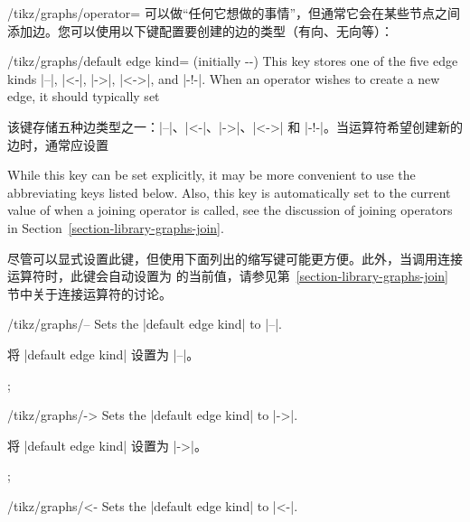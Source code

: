 \begin{key}{/tikz/graphs/operator=}
     可以做“任何它想做的事情”，但通常它会在某些节点之间添加边。您可以使用以下键配置要创建的边的类型（有向、无向等）：

    \begin{key}{/tikz/graphs/default edge kind= (initially -\/-)}
        This key stores one of the five edge kinds |--|, |<-|, |->|, |<->|, and
        |-!-|. When an operator wishes to create a new edge, it should
        typically set

        该键存储五种边类型之一：|--|、|<-|、|->|、|<->| 和 |-!-|。当运算符希望创建新的边时，通常应设置
\begin{codeexample}
\end{codeexample}
        While this key can be set explicitly, it may be more convenient to use
        the abbreviating keys listed below. Also, this key is automatically set
        to the current value of  when a joining
        operator is called, see the discussion of joining operators in
        Section~\ref{section-library-graphs-join}.

        尽管可以显式设置此键，但使用下面列出的缩写键可能更方便。此外，当调用连接运算符时，此键会自动设置为  的当前值，请参见第~\ref{section-library-graphs-join} 节中关于连接运算符的讨论。

      \end{key}
    \begin{key}{/tikz/graphs/--}
        Sets the |default edge kind| to |--|.
        
        将 |default edge kind| 设置为 |--|。


\begin{codeexample}[preamble={\usetikzlibrary{graphs.standard}}]
\tikz {};
\end{codeexample}
    \end{key}
    \begin{key}{/tikz/graphs/->}
        Sets the |default edge kind| to |->|.
        
        将 |default edge kind| 设置为 |->|。


\begin{codeexample}[preamble={\usetikzlibrary{graphs.standard}}]
\tikz {};
\end{codeexample}
    \end{key}
    \begin{key}{/tikz/graphs/<-}
        Sets the |default edge kind| to |<-|.
        

\end{key}
\end{key}
